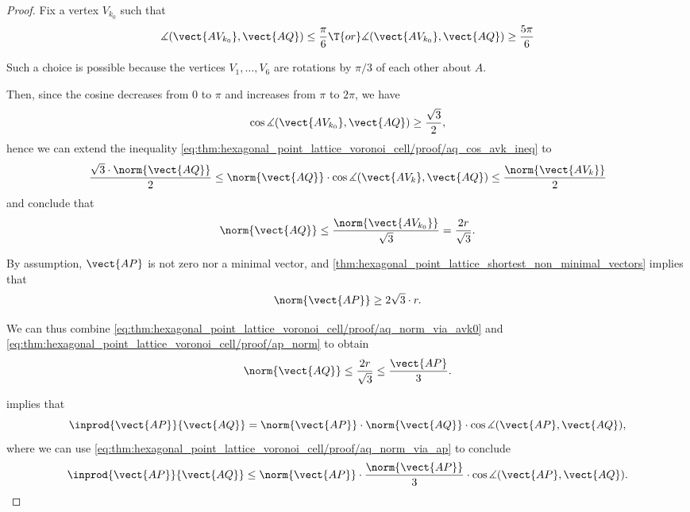 \begin{proof}
  Fix a vertex \( V_{k_0} \) such that
  \begin{equation*}
    \measuredangle(\vect{AV_{k_0}}, \vect{AQ}) \leq \frac \pi 6 \T{or} \measuredangle(\vect{AV_{k_0}}, \vect{AQ}) \geq \frac {5\pi} 6
  \end{equation*}

  Such a choice is possible because the vertices \( V_1, \ldots, V_6 \) are rotations by \( \pi / 3 \) of each other about \( A \).

  Then, since the cosine decreases from \( 0 \) to \( \pi \) and increases from \( \pi \) to \( 2\pi \), we have
  \begin{equation*}
    \cos \measuredangle(\vect{AV_{k_0}}, \vect{AQ}) \geq \frac {\sqrt 3} 2,
  \end{equation*}
  hence we can extend the inequality \eqref{eq:thm:hexagonal_point_lattice_voronoi_cell/proof/aq_cos_avk_ineq} to
  \begin{equation*}
    \frac {\sqrt 3 \cdot \norm{\vect{AQ}}} 2 \leq \norm{\vect{AQ}} \cdot \cos\measuredangle(\vect{AV_k}, \vect{AQ}) \leq \frac {\norm{\vect{AV_k}}} 2
  \end{equation*}
  and conclude that
  \begin{equation}\label{eq:thm:hexagonal_point_lattice_voronoi_cell/proof/aq_norm_via_avk0}
    \norm{\vect{AQ}} \leq \frac {\norm{\vect{AV_{k_0}}}} {\sqrt 3} = \frac {2r} {\sqrt 3}.
  \end{equation}

  By assumption, \( \vect{AP} \) is not zero nor a minimal vector, and \cref{thm:hexagonal_point_lattice_shortest_non_minimal_vectors} implies that
  \begin{equation}\label{eq:thm:hexagonal_point_lattice_voronoi_cell/proof/ap_norm}
    \norm{\vect{AP}} \geq 2 \sqrt 3 \cdot r.
  \end{equation}

  We can thus combine \eqref{eq:thm:hexagonal_point_lattice_voronoi_cell/proof/aq_norm_via_avk0} and \eqref{eq:thm:hexagonal_point_lattice_voronoi_cell/proof/ap_norm} to obtain
  \begin{equation}\label{eq:thm:hexagonal_point_lattice_voronoi_cell/proof/aq_norm_via_ap}
    \norm{\vect{AQ}} \leq \frac {2r} {\sqrt 3} \leq \frac {\vect{AP}} 3.
  \end{equation}

   implies that
  \begin{equation*}
    \inprod {\vect{AP}} {\vect{AQ}}
    =
    \norm{\vect{AP}} \cdot \norm{\vect{AQ}} \cdot \cos\measuredangle(\vect{AP}, \vect{AQ}),
  \end{equation*}
  where we can use \eqref{eq:thm:hexagonal_point_lattice_voronoi_cell/proof/aq_norm_via_ap} to conclude
  \begin{equation*}
    \inprod {\vect{AP}} {\vect{AQ}}
    \leq
    \norm{\vect{AP}} \cdot \frac {\norm{\vect{AP}}} 3 \cdot \cos\measuredangle(\vect{AP}, \vect{AQ}).
  \end{equation*}


\end{proof}
